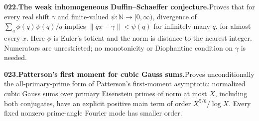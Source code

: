 \documentclass[11pt,a4paper]{article}
\begin{document}
  \par \begin{minipage}{\linewidth}
  \fontsize{10.5}{12.6}\selectfont\RaggedRight
  \hypertarget{result 022}{}
  {\bfseries\textcolor{muted}{022.}\enspace The weak inhomogeneous Duffin--Schaeffer conjecture.}\enspace Proves that for every real shift $\gamma$ and finite-valued $\psi:\mathbb N\to[0,\infty)$, divergence of $\sum_q\phi(q)\psi(q)/q$ implies $\|qx-\gamma\|<\psi(q)$ for infinitely many $q$, for almost every $x$. Here $\phi$ is Euler's totient and the norm is distance to the nearest integer. Numerators are unrestricted; no monotonicity or Diophantine condition on $\gamma$ is needed.\par
  \end{minipage}\par\vspace{5pt}



  \par \begin{minipage}{\linewidth}
  \fontsize{10.5}{12.6}\selectfont\RaggedRight
  \hypertarget{result 023}{}
  {\bfseries\textcolor{muted}{023.}\enspace Patterson’s first moment for cubic Gauss sums.}\enspace Proves unconditionally the all-primary-prime form of Patterson’s first-moment asymptotic: normalized cubic Gauss sums over primary Eisenstein primes of norm at most $X$, including both conjugates, have an explicit positive main term of order $X^{5/6}/\log X$. Every fixed nonzero prime-angle Fourier mode has smaller order.\par
  \end{minipage}\par\vspace{5pt}
\end{document}
